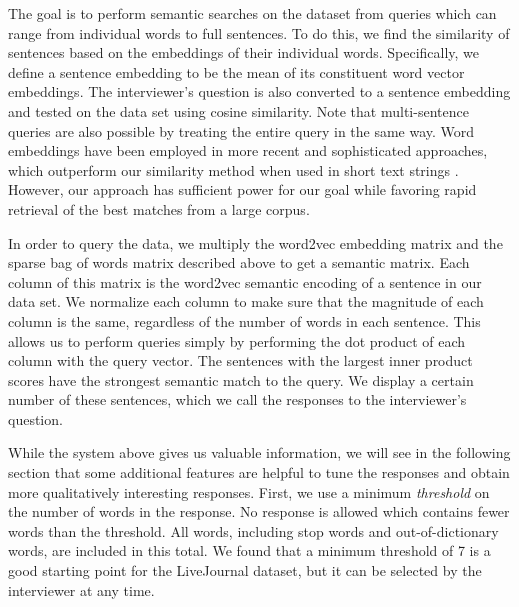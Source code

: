 \documentclass{sigchi}
\begin{document}
The goal is to perform semantic searches on the dataset from queries which can range from individual words to full sentences. To do this, we find the similarity of sentences based on the embeddings of their individual words. Specifically, we define a sentence embedding to be the mean of its constituent word vector embeddings. The interviewer's question is also converted to a sentence embedding and tested on the data set using cosine similarity. Note that multi-sentence queries are also possible by treating the entire query in the same way. Word embeddings have been employed in more recent and sophisticated approaches, which outperform our similarity method when used in short text strings \cite{kenter15short}. However, our approach has sufficient power for our goal while favoring rapid retrieval of the best matches from a large corpus. 

In order to query the data, we multiply the word2vec embedding matrix and the sparse bag of words matrix described above to get a semantic matrix. Each column of this matrix is the word2vec semantic encoding of a sentence in our data set. We normalize each column to make sure that the magnitude of each column is the same, regardless of the number of words in each sentence. This allows us to perform queries simply by performing the dot product of each column with the query vector. The sentences with the largest inner product scores have the strongest semantic match to the query. We display a certain number of these sentences, which we call the responses to the interviewer's question.

While the system above gives us valuable information, we will see in the following section that some additional features are helpful to tune the responses and obtain more qualitatively interesting responses. First, we use a minimum {\em threshold} on the number of words in the response. No response is allowed which contains fewer words than the threshold. All words, including stop words and out-of-dictionary words, are included in this total. 
We found that a minimum threshold of 7 is a good starting point for the LiveJournal dataset, but it can be selected by the interviewer at any time.
\end{document}
